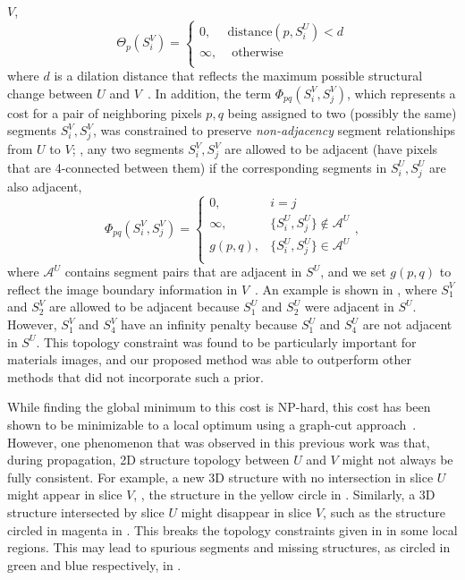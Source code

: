 \documentclass[]{spie}  %
\begin{document}
$V$,
\begin{equation}
  \Theta_p(S^{V}_i) = \left\{
    \begin{array}{lcr}
      0, &  \textrm{distance}(p,S^U_i) < d  \\
      \infty, & \textrm{ otherwise} \\
    \end{array}
  \right.
  \label{eq:theta}
\end{equation}
where $d$ is a dilation distance that reflects the maximum possible
structural change between $U$ and $V$~\cite{waggoner:11}.  In
addition, the \smooth{} term $\Phi_{pq}(S_i^V , S_j^V)$, which
represents a cost for a pair of neighboring pixels $p,q$ being
assigned to two (possibly the same) segments $S^V_i, S^V_j$, was
constrained to preserve \emph{non-adjacency} segment relationships
from $U$ to $V$; \ie, any two segments $S^V_i, S^V_j$ are allowed to
be adjacent (have pixels that are 4-connected between them) if the
corresponding segments in $S^U_i, S^U_j$ are also adjacent,
\begin{equation} \Phi_{pq}(S^V_i , S^V_j) = \left\{
    \begin{array}{lcr}
      0, & i = j \\
      \infty, & \{ S^U_i, S^U_j \} \notin \mathcal{A}^U  \\
      g( p, q ), & \{ S^U_i, S^U_j \} \in \mathcal{A}^U \\
    \end{array}
  \right. ,
  \label{eq:phi}
\end{equation}
where $\mathcal{A}^U$ contains segment pairs that are adjacent in
$S^U$, and we set $g(p,q)$ to reflect the image boundary information
in $V$~\cite{waggoner:11}.  An example is shown in ,
where $S^V_1$ and $S^V_2$ are allowed to be adjacent because $S^U_1$
and $S^U_2$ were adjacent in $S^U$.  However, $S^V_1$ and $S^V_4$ have
an infinity penalty because $S^U_1$ and $S^U_4$ are not adjacent in
$S^U$.  This topology constraint was found to be particularly
important for materials images, and our proposed method was able to
outperform other methods that did not incorporate such a prior.

While finding the global minimum to this cost is NP-hard, this cost
has been shown to be minimizable to a local optimum using a graph-cut
approach~\cite{veksler:99, boykov:01}.  However, one phenomenon that
was observed in this previous work was that, during propagation, 2D
structure topology between $U$ and $V$ might not always be fully
consistent.  For example, a new 3D structure with no intersection in
slice $U$ might appear in slice $V$, \eg, the structure in the yellow
circle in .  Similarly, a 3D structure intersected by
slice $U$ might disappear in slice $V$, such as the structure circled
in magenta in .  This breaks the topology constraints
given in  in some local regions.  This may lead to spurious
segments and missing structures, as circled in green and blue
respectively, in .  
\end{document}
